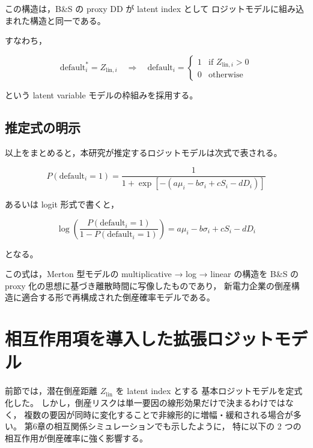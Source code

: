この構造は，B\&S の proxy DD が latent index として
ロジットモデルに組み込まれた構造と同一である。

すなわち，



\[
\text{default}_i^*
= Z_{\text{lin},i}
\quad\Rightarrow\quad
\text{default}_i
=
\begin{cases}
1 & \text{if } Z_{\text{lin},i} > 0 \\
0 & \text{otherwise}
\end{cases}
\]



という latent variable モデルの枠組みを採用する。

\subsection{推定式の明示}

以上をまとめると，本研究が推定するロジットモデルは次式で表される。



\[
P(\text{default}_i = 1)
= \frac{1}{1 + \exp\left[-(a\mu_i - b\sigma_i + cS_i - dD_i)\right]}
\]



あるいは logit 形式で書くと，



\[
\log\left(\frac{P(\text{default}_i = 1)}{1 - P(\text{default}_i = 1)}\right)
= a\mu_i - b\sigma_i + cS_i - dD_i
\]



となる。

この式は，Merton 型モデルの multiplicative → log → linear の構造を
B\&S の proxy 化の思想に基づき離散時間に写像したものであり，
新電力企業の倒産構造に適合する形で再構成された倒産確率モデルである。




\section{相互作用項を導入した拡張ロジットモデル}

前節では，潜在倒産距離 $Z_{\text{lin}}$ を latent index とする
基本ロジットモデルを定式化した。
しかし，倒産リスクは単一要因の線形効果だけで決まるわけではなく，
複数の要因が同時に変化することで非線形的に増幅・緩和される場合が多い。
第6章の相互関係シミュレーションでも示したように，
特に以下の 2 つの相互作用が倒産確率に強く影響する。

